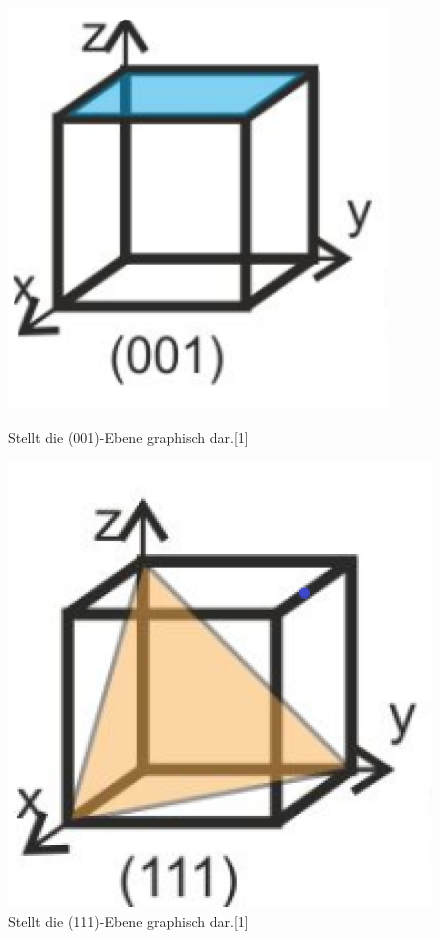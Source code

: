 \documentclass[
	a4paper,
	12pt,
	pagesize,
	ngerman
]{scrartcl}
\begin{document}
\begin{figure}[h!]
    \centering
        \begin{minipage}[t]{0.45\linewidth}
            \centering
            \includegraphics[scale = 0.4]{001.png}
            \caption{Stellt die (001)-Ebene graphisch dar.[1]}
            \label{A1}
        \end{minipage}
        \hfill
        \begin{minipage}[t]{0.45\linewidth}
            \centering
            \includegraphics[scale = 0.25]{111.png}
            \caption{Stellt die (111)-Ebene graphisch dar.[1]}
            \label{A2}
        \end{minipage}
\end{figure}
\end{document}
